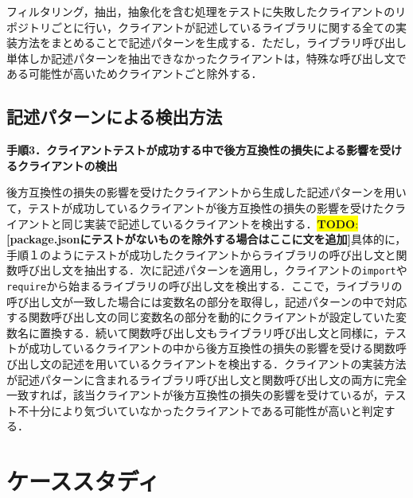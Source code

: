 \documentclass[11pt]{jreport}
\newcommand{\todo}[1]{\colorbox{yellow}{{\bf TODO}:}{\color{red} {\textbf{[#1]}}}}
\begin{document}
フィルタリング，抽出，抽象化を含む処理をテストに失敗したクライアントのリポジトリごとに行い，クライアントが記述しているライブラリに関する全ての実装方法をまとめることで記述パターンを生成する．ただし，ライブラリ呼び出し単体しか記述パターンを抽出できなかったクライアントは，特殊な呼び出し文である可能性が高いためクライアントごと除外する．
\section{記述パターンによる検出方法}

\noindent\textbf{手順3．クライアントテストが成功する中で後方互換性の損失による影響を受けるクライアントの検出}

後方互換性の損失の影響を受けたクライアントから生成した記述パターンを用いて，テストが成功しているクライアントが後方互換性の損失の影響を受けたクライアントと同じ実装で記述しているクライアントを検出する．\todo{package.jsonにテストがないものを除外する場合はここに文を追加}具体的に，手順１のようにテストが成功したクライアントからライブラリの呼び出し文と関数呼び出し文を抽出する．次に記述パターンを適用し，クライアントの\texttt{import}や\texttt{require}から始まるライブラリの呼び出し文を検出する．ここで，ライブラリの呼び出し文が一致した場合には変数名の部分を取得し，記述パターンの中で対応する関数呼び出し文の同じ変数名の部分を動的にクライアントが設定していた変数名に置換する．続いて関数呼び出し文もライブラリ呼び出し文と同様に，テストが成功しているクライアントの中から後方互換性の損失の影響を受ける関数呼び出し文の記述を用いているクライアントを検出する．クライアントの実装方法が記述パターンに含まれるライブラリ呼び出し文と関数呼び出し文の両方に完全一致すれば，該当クライアントが後方互換性の損失の影響を受けているが，テスト不十分により気づいていなかったクライアントである可能性が高いと判定する．


\chapter{ケーススタディ}\label{chap:case_study}
\end{document}

